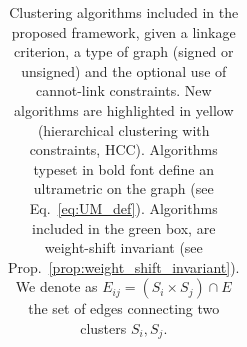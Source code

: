 \begin{table}[t]
\begin{subtable}[t!]{\textwidth}
\begin{tabular}{l |c  c  c  c  c}
            
             


             





        \end{tabular}
    \end{subtable} 
    \caption{Clustering algorithms included in the proposed \algname{} framework, given a linkage criterion, a type of graph (signed or unsigned) and the optional use of cannot-link constraints. New algorithms are highlighted in yellow (hierarchical clustering with constraints, HCC). Algorithms typeset in bold font define an ultrametric on the graph (see Eq.~\ref{eq:UM_def}). Algorithms included in the green box, are weight-shift invariant (see Prop.~\ref{prop:weight_shift_invariant}). 
    We denote as $E_{ij}=(S_i \times S_{j}) \cap E$ the set of edges connecting two clusters $S_i, S_j$. } 
    \label{tab:linkage-criteria}
\end{table}



